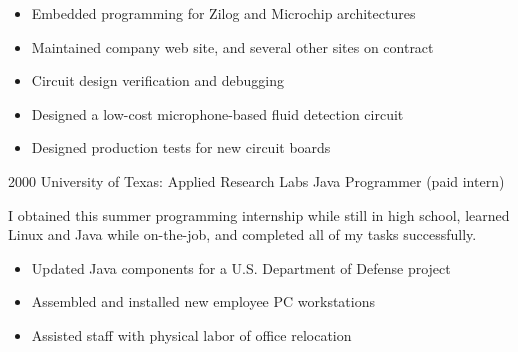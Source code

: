 \documentclass[]{friggeri-cv}
\begin{document}
\begin{entrylist}
{      \begin{itemize}
      \item{Embedded programming for Zilog and Microchip architectures}
      \item{Maintained company web site, and several other sites on contract}
      \item{Circuit design verification and debugging}
      \item{Designed a low-cost microphone-based fluid detection circuit}
      \item{Designed production tests for new circuit boards}
      \end{itemize}
    }
  \entry
    {2000}
    {University of Texas: Applied Research Labs}
    {Java Programmer (paid intern)}
    {

      I obtained this summer programming internship while still in
      high school, learned Linux and Java while on-the-job, and
      completed all of my tasks successfully.\\
      
      \begin{itemize}
      \item{Updated Java components for a U.S. Department of Defense project}
      \item{Assembled and installed new employee PC workstations}
      \item{Assisted staff with physical labor of office relocation}
      \end{itemize}
    }
\end{entrylist}
\end{document}
